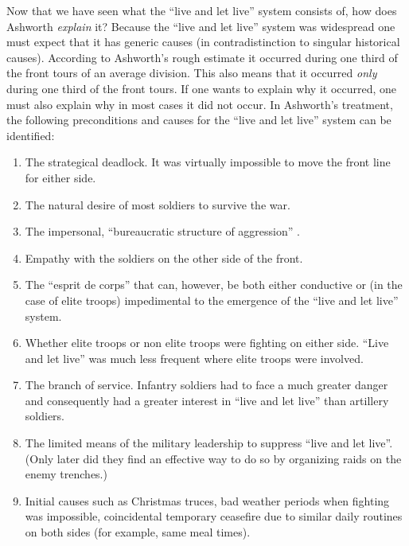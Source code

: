 Now that we have seen what the ``live and let live'' system consists of, how
does Ashworth {\em explain} it?  Because the ``live and let live'' system was
widespread one must expect that it has generic causes (in contradistinction to
singular historical causes). According to Ashworth's rough estimate it
occurred during one third of the front tours of an average division. This also
means that it occurred {\em only} during one third of the front tours.  If one
wants to explain why it occurred, one must also explain why in most
cases it did not occur. In Ashworth's treatment, the following preconditions
and causes for the ``live and let live'' system can be identified:

\begin{enumerate}

\label{liveAndLetLive}
\item The strategical deadlock. It was virtually impossible to move the
  front line for either side.

\item The natural desire of most soldiers to survive the war.

\item The impersonal, ``bureaucratic structure of aggression'' \cite[p.
76ff.]{ashworth:1980}.

\item Empathy with the soldiers on the other side of the front.

\item The ``esprit de corps'' that can, however, be both either conductive or
  (in the case of elite troops) impedimental to the emergence of the ``live
  and let live'' system.

\item Whether elite troops or non elite troops were fighting on either side.
  ``Live and let live'' was much less frequent where elite troops were
  involved.

\item The branch of service. Infantry soldiers had to face a much greater
  danger and consequently had a greater interest in ``live and let live'' than
  artillery soldiers.

\item The limited means of the military leadership to suppress ``live and let
  live''. (Only later did they find an effective way to do so by organizing
  raids on the enemy trenches.)

\item Initial causes such as Christmas truces, bad weather periods when
  fighting was impossible, coincidental temporary ceasefire due to similar
  daily routines on both sides (for example, same meal times).

\end{enumerate}

